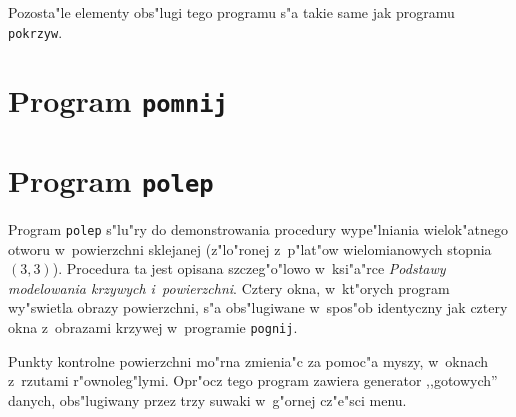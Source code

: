 Pozosta"le elementy obs"lugi tego programu s"a takie same jak programu
\texttt{pokrzyw}.


\section{Program \texttt{pomnij}}

\section{Program \texttt{polep}}

\begin{sloppypar}
Program \texttt{polep} s"lu"ry do demonstrowania procedury wype"lniania
wielok"atnego otwo\-ru w~powierzchni sklejanej (z"lo"ronej z~p"lat"ow
wielomianowych stopnia $(3,3)$). Procedura ta jest opisana szczeg"o"lowo
w~ksi"a"rce \emph{Podstawy modelowania krzywych i~powierzchni}. Cztery okna,
w~kt"orych program wy"swietla obrazy powierzchni, s"a obs"lugiwane w~spos"ob
identyczny jak cztery okna z~obrazami krzywej w~programie
\texttt{pognij}.
\end{sloppypar}

Punkty kontrolne powierzchni mo"rna zmienia"c za pomoc"a myszy, w~oknach
z~rzutami r"ownoleg"lymi. Opr"ocz tego program zawiera generator
,,gotowych'' danych, obs"lugiwany przez trzy suwaki w~g"ornej cz"e"sci menu.


